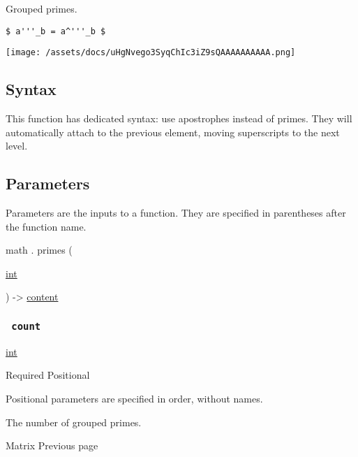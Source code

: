 Grouped primes.

\begin{verbatim}
$ a'''_b = a^'''_b $
\end{verbatim}

\texttt{[image: /assets/docs/uHgNvego3SyqChIc3iZ9sQAAAAAAAAAA.png]}

\subsection{Syntax}\label{syntax}

This function has dedicated syntax: use apostrophes instead of primes.
They will automatically attach to the previous element, moving
superscripts to the next level.

\subsection{\texorpdfstring{{ Parameters
}}{ Parameters }}\label{parameters}

\label{parameters-tooltip}
Parameters are the inputs to a function. They are specified in
parentheses after the function name.

math { . } { primes } (

{ \href{/docs/reference/foundations/int/}{int} }

) -\textgreater{} \href{/docs/reference/foundations/content/}{content}

\subsubsection{\texorpdfstring{\texttt{\ count\ }}{ count }}\label{parameters-count}

\href{/docs/reference/foundations/int/}{int}

{Required} {{ Positional }}

\label{parameters-count-positional-tooltip}
Positional parameters are specified in order, without names.

The number of grouped primes.

\href{/docs/reference/math/mat/}{\pandocbounded{}}

{ Matrix } { Previous page }

\href{/docs/reference/math/roots/}{\pandocbounded{}}

